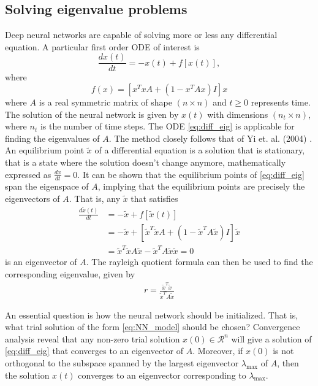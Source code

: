 \documentclass[12pt]{extarticle}
\begin{document}
\subsection*{Solving eigenvalue problems}
Deep neural networks are capable of solving more or less any differential equation. A particular first order ODE of interest is 
\begin{equation}
	\frac{dx(t)}{dt} = -x(t) + f[x(t)],
	\label{eq:diff_eig}
\end{equation}
where
\[ f(x) = [x^TxA + (1 - x^TAx)I]x \]
where $A$ is a real symmetric matrix of shape $(n\times n)$ and $t \ge 0$ represents time. The solution of the neural network is given by $x(t)$ with dimensions $(n_t\times n)$, where $n_t$ is the number of time steps. The ODE \eqref{eq:diff_eig} is applicable for finding the eigenvalues of $A$. The method closely follows that of Yi et. al. (2004) \cite{yi2004neural}. An equilibrium point $\tilde{x}$ of a differential equation is a solution that is stationary, that is a state where the solution doesn't change anymore, mathematically expressed as $\frac{dx}{dt} = 0$. It can be shown that the equilibrium points of \eqref{eq:diff_eig} span the eigenspace of $A$, implying that the equilibrium points are precisely the eigenvectors of $A$. That is, any $\tilde{x}$ that satisfies
\begin{align*}
	\frac{d\tilde{x}(t)}{dt} &= -\tilde{x} + f[\tilde{x}(t)] \\
	&= -\tilde{x} + [\tilde{x}^T\tilde{x}A + (1 - \tilde{x}^TA\tilde{x})I]\tilde{x} \\
	&= \tilde{x}^T\tilde{x}A\tilde{x} - \tilde{x}^TA\tilde{x}\tilde{x} = 0
\end{align*}
is an eigenvector of $A$. The rayleigh quotient formula can then be used to find the corresponding eigenvalue, given by
\begin{align} \label{eq:rayleigh_quotient}
	r = \frac{\tilde{x}^T\tilde{x}}{\tilde{x}^T A \tilde{x}}
\end{align}

An essential question is how the neural network should be initialized. That is, what trial solution of the form \eqref{eq:NN_model} should be chosen? Convergence analysis reveal that any non-zero trial solution $x(0) \in \mathcal{R}^n$ will give a solution of \eqref{eq:diff_eig} that converges to an eigenvector of $A$. Moreover, if $x(0)$ is not orthogonal to the subspace spanned by the largest eigenvector $\lambda_{\mathrm{max}}$ of $A$, then the solution $x(t)$ converges to an eigenvector corresponding to $\lambda_{\mathrm{max}}$.
\end{document}
